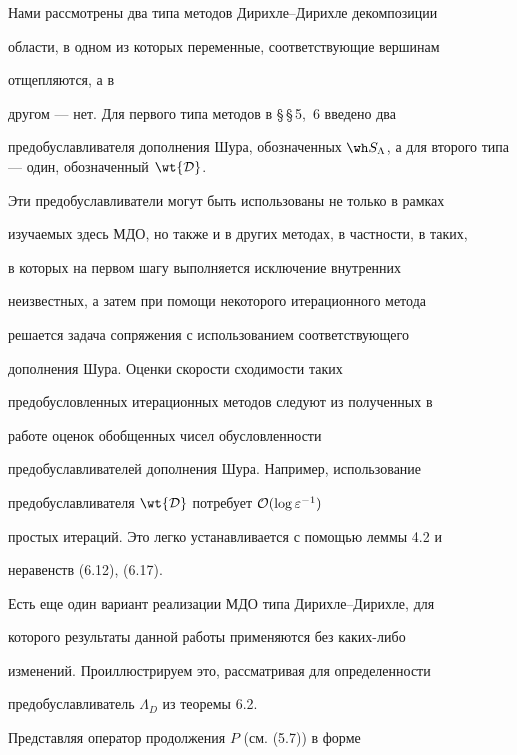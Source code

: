 \begin{notes}


Нами рассмотрены два типа методов Дирихле--Дирихле декомпозиции 


области, в одном из которых переменные, соответствующие вершинам 


отщепляются, а в 


другом --- нет. Для первого типа методов в \S\,\S\,5,~6 введено два 


предобуславливателя дополнения Шура, обозначенных $\wh 


S_{\Lambda}$, а для второго типа --- один, обозначенный $\wt {\cal D}$.


Эти предобуславливатели могут быть использованы не только в рамках 


изучаемых здесь МДО, но также и в других методах, в частности, в таких, 


в которых на первом шагу выполняется исключение внутренних 


неизвестных, а затем при помощи некоторого итерационного метода 


решается задача сопряжения с использованием соответствующего 


дополнения Шура. Оценки скорости сходимости таких 


предобусловленных итерационных методов следуют из полученных в 


работе оценок обобщенных чисел обусловленности 


предобуславливателей дополнения Шура. Например, использование 


предобуславливателя $\wt {\cal D}$ потребует ${\cal O}(\log\varepsilon^{-1})$ 


простых итераций. Это легко устанавливается с помощью леммы 4.2 и 


неравенств (6.12), (6.17).


\end{notes}





Есть еще один вариант реализации МДО типа Дирихле--Дирихле, для 


которого результаты данной работы применяются без каких-либо 


изменений. Проиллюстрируем это, рассматривая для определенности 


предобуславливатель $\Lambda_D$ из теоремы 6.2.





Представляя оператор продолжения $P$ (см. (5.7)) в форме


